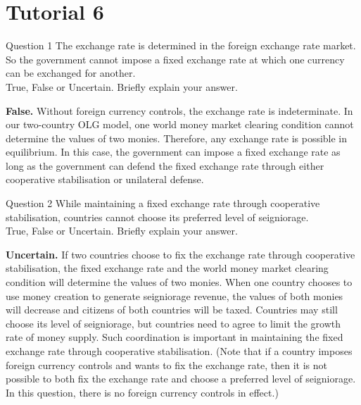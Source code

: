 \documentclass[a4paper]{article}
\newif\IfInSansMode
\numberwithin{equation}{section}
\numberwithin{figure}{section}
\begin{document}
\section{Tutorial 6}
	\begin{questionbox}{Question 1}
		The exchange rate is determined in the foreign exchange rate market. So the government cannot impose a fixed exchange rate at which one currency can be exchanged for another.\\
		True, False or Uncertain. Briefly explain your answer.
		\begin{explanationbox}
			\textbf{False.} Without foreign currency controls, the exchange rate is indeterminate. In our two-country OLG model, one world money market clearing condition cannot determine the values of two monies. Therefore, any exchange rate is possible in equilibrium. In this case, the government can impose a fixed exchange rate as long as the government can defend the fixed exchange rate through either cooperative stabilisation or unilateral defense.
		\end{explanationbox}
	\end{questionbox}
	\begin{questionbox}{Question 2}
		While maintaining a fixed exchange rate through cooperative stabilisation, countries cannot choose its preferred level of seigniorage.\\
		True, False or Uncertain. Briefly explain your answer.
		\begin{explanationbox}
			\textbf{Uncertain.} If two countries choose to fix the exchange rate through cooperative stabilisation, the fixed exchange rate and the world money market clearing condition will determine the values of two monies. When one country chooses to use money creation to generate seigniorage revenue, the values of both monies will decrease and citizens of both countries will be taxed. Countries may still choose its level of seigniorage, but countries need to agree to limit the growth rate of money supply. Such coordination is important in maintaining the fixed exchange rate through cooperative stabilisation. (Note that if a country imposes foreign currency controls and wants to fix the exchange rate, then it is not possible to both fix the exchange rate and choose a preferred level of seigniorage. In this question, there is no foreign currency controls in effect.)
		\end{explanationbox}
	\end{questionbox}
\end{document}
